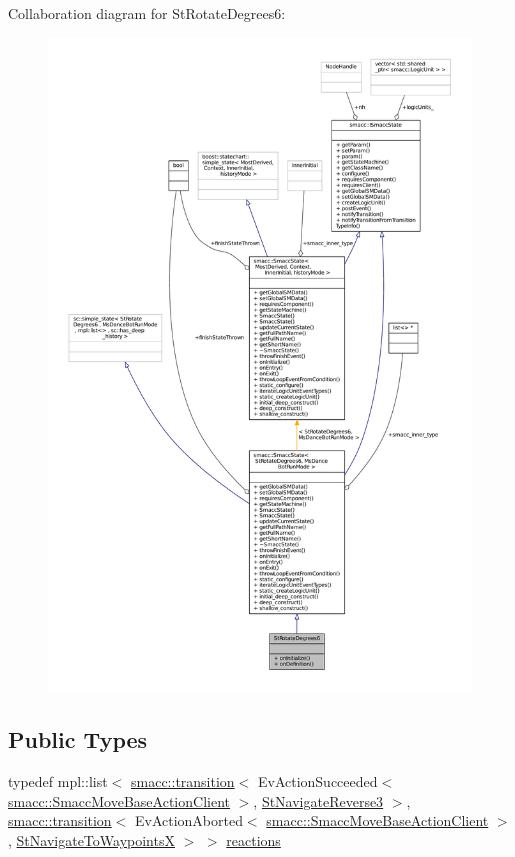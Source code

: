 Collaboration diagram for St\+Rotate\+Degrees6\+:
\nopagebreak
\begin{figure}[H]
\begin{center}
\leavevmode
\includegraphics[width=350pt]{structStRotateDegrees6__coll__graph}
\end{center}
\end{figure}
\subsection*{Public Types}
\begin{DoxyCompactItemize}
\item 
typedef mpl\+::list$<$ \hyperlink{classsmacc_1_1transition}{smacc\+::transition}$<$ Ev\+Action\+Succeeded$<$ \hyperlink{classsmacc_1_1SmaccMoveBaseActionClient}{smacc\+::\+Smacc\+Move\+Base\+Action\+Client} $>$, \hyperlink{structStNavigateReverse3}{St\+Navigate\+Reverse3} $>$, \hyperlink{classsmacc_1_1transition}{smacc\+::transition}$<$ Ev\+Action\+Aborted$<$ \hyperlink{classsmacc_1_1SmaccMoveBaseActionClient}{smacc\+::\+Smacc\+Move\+Base\+Action\+Client} $>$, \hyperlink{structStNavigateToWaypointsX}{St\+Navigate\+To\+WaypointsX} $>$ $>$ \hyperlink{structStRotateDegrees6_ab6e035aae7342956c8ec0f0b2bc3d9cf}{reactions}
\end{DoxyCompactItemize}
